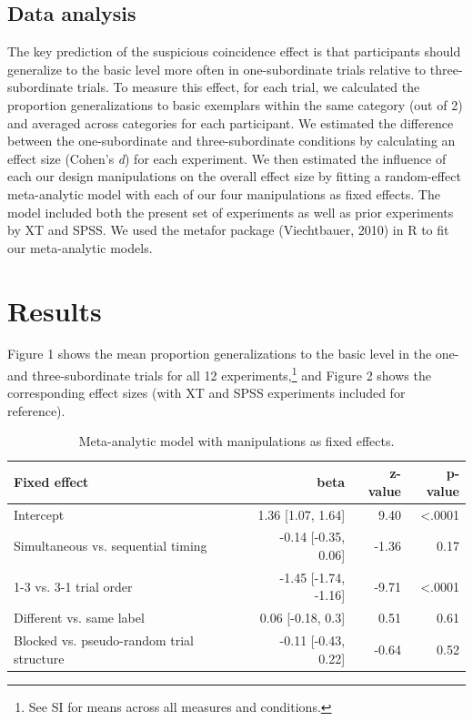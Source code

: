 \documentclass[english,floatsintext,man]{apa6}
\theoremstyle{definition}
\theoremstyle{definition}
\theoremstyle{definition}
\theoremstyle{remark}
\begin{document}
\subsection{Data analysis}\label{data-analysis}

The key prediction of the suspicious coincidence effect is that
participants should generalize to the basic level more often in
one-subordinate trials relative to three-subordinate trials. To measure
this effect, for each trial, we calculated the proportion
generalizations to basic exemplars within the same category (out of 2)
and averaged across categories for each participant. We estimated the
difference between the one-subordinate and three-subordinate conditions
by calculating an effect size (Cohen's \emph{d}) for each experiment. We
then estimated the influence of each our design manipulations on the
overall effect size by fitting a random-effect meta-analytic model with
each of our four manipulations as fixed effects. The model included both
the present set of experiments as well as prior experiments by XT and
SPSS. We used the metafor package (Viechtbauer, 2010) in R to fit our
meta-analytic models.

\section{Results}\label{results}

Figure 1 shows the mean proportion generalizations to the basic level in
the one- and three-subordinate trials for all 12
experiments,\footnote{See SI for means across all measures and conditions.}
and Figure 2 shows the corresponding effect sizes (with XT and SPSS
experiments included for reference).

\begin{table}

\caption{\label{tab:unnamed-chunk-5}Meta-analytic model with manipulations as fixed effects.}
\centering
\fontsize{12}{14}\selectfont
\begin{tabular}[t]{lrrr}
\toprule
Fixed effect & beta & z-value & p-value\\
\midrule
Intercept & 1.36 [1.07, 1.64] & 9.40 & <.0001\\
Simultaneous vs. sequential timing & -0.14 [-0.35, 0.06] & -1.36 & 0.17\\
1-3 vs. 3-1 trial order & -1.45 [-1.74, -1.16] & -9.71 & <.0001\\
Different vs. same label & 0.06 [-0.18, 0.3] & 0.51 & 0.61\\
Blocked vs. pseudo-random trial structure & -0.11 [-0.43, 0.22] & -0.64 & 0.52\\
\bottomrule
\end{tabular}
\end{table}
\end{document}
